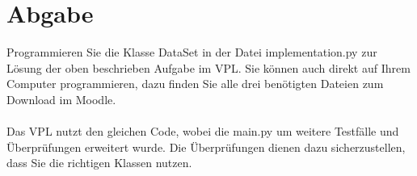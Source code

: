 \documentclass[]{article}
\begin{document}
\section{Abgabe}
Programmieren Sie die Klasse \grqq DataSet\grqq{} in der Datei \grqq implementation.py\grqq{} zur Lösung der oben beschrieben Aufgabe im VPL.
Sie können auch direkt auf Ihrem Computer programmieren, dazu finden Sie alle drei benötigten Dateien zum Download im Moodle.\\
\\
Das VPL nutzt den gleichen Code, wobei die \grqq main.py\grqq{} um weitere Testfälle und Überprüfungen erweitert wurde.
Die Überprüfungen dienen dazu sicherzustellen, dass Sie die richtigen Klassen nutzen.\\
\end{document}
